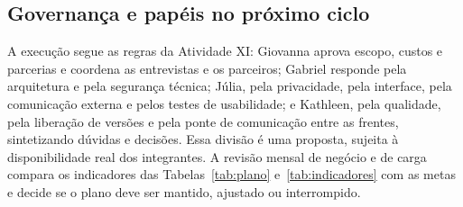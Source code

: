 \subsection{Governança e papéis no próximo ciclo}

A execução segue as regras da Atividade XI: Giovanna aprova escopo, custos e parcerias e coordena as entrevistas e os parceiros; Gabriel responde pela arquitetura e pela segurança técnica; Júlia, pela privacidade, pela interface, pela comunicação externa e pelos testes de usabilidade; e Kathleen, pela qualidade, pela liberação de versões e pela ponte de comunicação entre as frentes, sintetizando dúvidas e decisões. Essa divisão é uma proposta, sujeita à disponibilidade real dos integrantes. A revisão mensal de negócio e de carga compara os indicadores das Tabelas~\ref{tab:plano} e~\ref{tab:indicadores} com as metas e decide se o plano deve ser mantido, ajustado ou interrompido.
